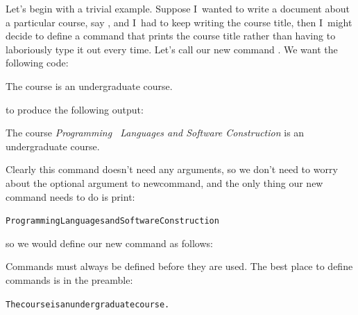 Let's begin with a trivial example.  Suppose I~wanted to write a
document about a particular course, say , and I~had to keep writing the course
title, then I~might decide to define a command that prints the course
title rather than having to laboriously type it out every time.
Let's call our new command .  We want the
following code:
\begin{codeS}
The course  is an undergraduate course.
\end{codeS}%
to produce the following output:
\begin{result}
The course \emph{Programming \textemdash\ Languages and Software Construction}
is an undergraduate course.
\end{result}%
Clearly this command doesn't need any arguments, so we don't need to
worry about the optional argument  to
\gls{newcommand}, and the only thing our new command needs to do
is print:
\begin{alltt}
Programming  Languages and Software Construction
\end{alltt}
so we would define our new command as follows:
\begin{code}
\end{code}%
Commands must always be defined before they are used.  The
best place to define commands is in the 
\gls{preamble}:
\begin{code}
\begin{alltt}




The course  is an undergraduate course.

\end{alltt}
\end{code}


